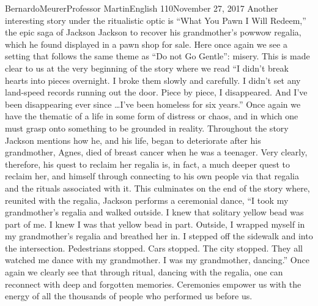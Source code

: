 \documentclass[12pt,letterpaper]{article}
\begin{document}
\begin{mla}{Bernardo}{Meurer}{Professor Martin}{English 110}{November 27, 2017}
        Another interesting story under the ritualistic optic is ``What You Pawn I Will Redeem,'' the epic saga of Jackson Jackson to recover his grandmother's powwow regalia, which he found displayed in a pawn shop for sale. Here once again we see a setting that follows the same theme as ``Do not Go Gentle'': misery. This is made clear to us at the very beginning of the story where we read ``I didn’t break hearts into pieces overnight. I broke them slowly and carefully. I didn’t set any land-speed records running out the door. Piece by piece, I disappeared. And I’ve been disappearing ever since \ldots I’ve been homeless for six years.'' Once again we have the thematic of a life in some form of distress or chaos, and in which one must grasp onto something to be grounded in reality. Throughout the story Jackson mentions how he, and his life, began to deteriorate after his grandmother, Agnes, died of breast cancer when he was a teenager. Very clearly, therefore, his quest to reclaim her regalia is, in fact, a much deeper quest to reclaim her, and himself through connecting to his own people via that regalia and the rituals associated with it. This culminates on the end of the story where, reunited with the regalia, Jackson performs a ceremonial dance, ``I took my grandmother’s regalia and walked outside. I knew that solitary yellow bead was part of me. I knew I was that yellow bead in part. Outside, I wrapped myself in my grandmother’s regalia and breathed her in. I stepped off the sidewalk and into the intersection. Pedestrians stopped. Cars stopped. The city stopped. They all watched me dance with my grandmother. I was my grandmother, dancing.'' Once again we clearly see that through ritual, dancing with the regalia, one can reconnect with deep and forgotten memories. Ceremonies empower us with the energy of all the thousands of people who performed us before us.


\end{mla}
\end{document}
